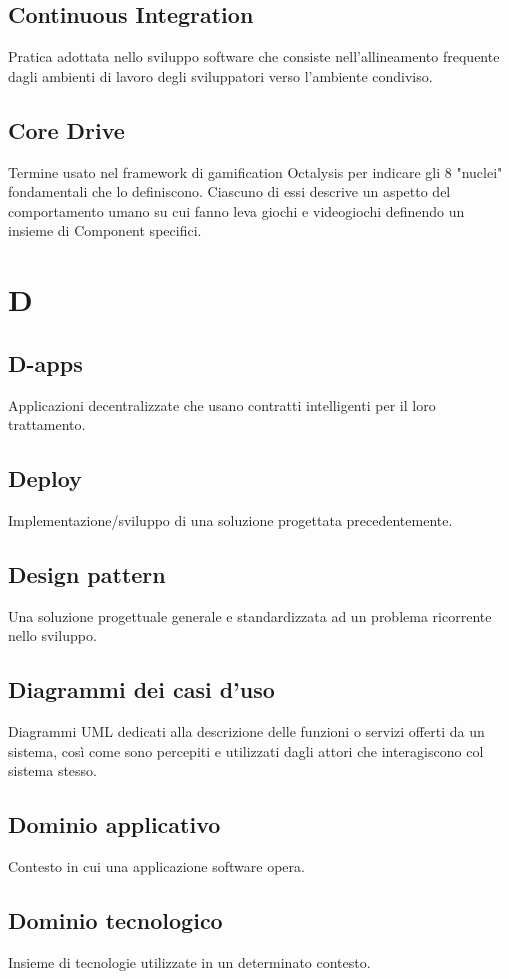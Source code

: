 \subsection*{Continuous Integration} Pratica adottata nello sviluppo software che consiste nell'allineamento frequente dagli ambienti di lavoro degli sviluppatori verso l'ambiente condiviso.
\subsection*{Core Drive} Termine usato nel framework di gamification Octalysis per indicare gli 8 "nuclei" fondamentali che lo definiscono. Ciascuno di essi descrive un aspetto del comportamento umano su cui fanno leva giochi e videogiochi definendo un insieme di Component specifici.
\newpage
\section{D}
\subsection*{D-apps} Applicazioni decentralizzate che usano contratti intelligenti per il loro trattamento.
\subsection*{Deploy} Implementazione/sviluppo di una soluzione progettata precedentemente.
\subsection*{Design pattern} Una soluzione progettuale generale e standardizzata ad un problema ricorrente nello sviluppo.
\subsection*{Diagrammi dei casi d'uso} Diagrammi UML dedicati alla descrizione delle funzioni o servizi offerti da un sistema, così come sono percepiti e utilizzati dagli attori che interagiscono col sistema stesso.
\subsection*{Dominio applicativo} Contesto in cui una applicazione software opera.
\subsection*{Dominio tecnologico} Insieme di tecnologie utilizzate in un determinato contesto.
